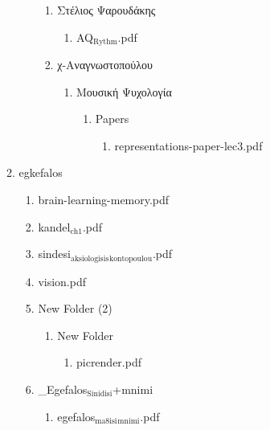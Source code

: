 \documentclass[11pt]{article}
\begin{document}
\begin{enumerate}
\begin{enumerate}
\begin{enumerate}
\begin{enumerate}
\item Στέλιος Ψαρουδάκης
\label{sec-1-1-1-1-49-2-2-1-64-4-6}
\begin{enumerate}
\item AQ$_{\text{Rythm}}$.pdf
\label{sec-1-1-1-1-49-2-2-1-64-4-6-1}
\end{enumerate}

\item χ-Αναγνωστοπούλου
\label{sec-1-1-1-1-49-2-2-1-64-4-7}
\begin{enumerate}
\item Μουσική Ψυχολογία
\label{sec-1-1-1-1-49-2-2-1-64-4-7-1}
\begin{enumerate}
\item Papers
\label{sec-1-1-1-1-49-2-2-1-64-4-7-1-1}
\begin{enumerate}
\item representations-paper-lec3.pdf
\label{sec-1-1-1-1-49-2-2-1-64-4-7-1-1-1}
\end{enumerate}
\end{enumerate}
\end{enumerate}
\end{enumerate}
\end{enumerate}

\item egkefalos
\label{sec-1-1-1-1-49-2-2-1-65}
\begin{enumerate}
\item brain-learning-memory.pdf
\label{sec-1-1-1-1-49-2-2-1-65-1}

\item kandel$_{\text{ch1}}$.pdf
\label{sec-1-1-1-1-49-2-2-1-65-2}

\item sindesi$_{\text{aksiologisis}}$$_{\text{kontopoulou}}$.pdf
\label{sec-1-1-1-1-49-2-2-1-65-3}

\item vision.pdf
\label{sec-1-1-1-1-49-2-2-1-65-4}

\item New Folder (2)
\label{sec-1-1-1-1-49-2-2-1-65-5}
\begin{enumerate}
\item New Folder
\label{sec-1-1-1-1-49-2-2-1-65-5-1}
\begin{enumerate}
\item picrender.pdf
\label{sec-1-1-1-1-49-2-2-1-65-5-1-1}
\end{enumerate}
\end{enumerate}

\item \_Egefalos$_{\text{Sinidisi}}$+mnimi
\label{sec-1-1-1-1-49-2-2-1-65-6}
\begin{enumerate}
\item egefalos$_{\text{ma8isi}}$$_{\text{mnimi}}$.pdf
\label{sec-1-1-1-1-49-2-2-1-65-6-1}


\end{enumerate}
\end{enumerate}
\end{enumerate}
\end{enumerate}
\end{document}
